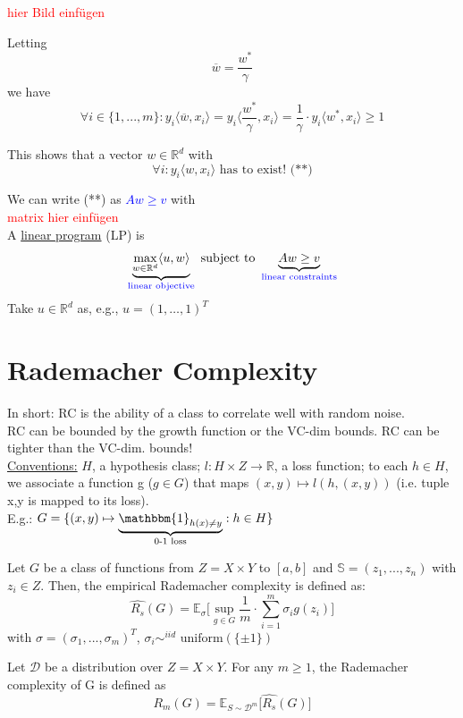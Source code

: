 \documentclass[10pt,a4paper]{article}
\theoremstyle{definition}
\theoremstyle{plain}
\begin{document}
\textcolor{red}{hier Bild einfügen}

Letting $$\overline{w} =  \frac{w^*}{\gamma}$$ we have 
$$
	\forall i \in \{ 1, ..., m \}: y_i \langle \overline{w}, x_i\rangle = y_i \langle \frac{w^*}{\gamma}, x_i \rangle = \frac{1}{\gamma} \cdot y_i \langle w^*, x_i \rangle \geq 1
$$

This shows that a vector $w \in \mathbb{R}^{d}$ with
$$
	\forall i: y_i \langle w, x_i \rangle \text{ has to exist! (**)}
$$

We can write (**) as \textcolor{blue}{$Aw \geq v$} with \\
\textcolor{red}{ matrix hier einfügen}\\
A \underline{linear program} (LP) is
$$
	\underbrace{\max_{w \in \mathbb{R}^{d}} \langle u, w \rangle}_{\text{\textcolor{blue}{linear objective}}} \text{ subject to } 
	\underbrace{Aw \geq v}_{\textcolor{blue}{\text{linear constraints}}}
$$ 
Take $u \in \mathbb{R}^{d}$ as, e.g., $u = (1, \hdots, 1)^T$ 

\part{Rademacher Complexity}
In short: RC is the ability of a class to correlate well with random noise.\\
RC can be bounded by the growth function or the VC-dim bounds. RC can be tighter than the VC-dim. bounds!\\
\underline{Conventions:} $H$, a hypothesis class; $l: H\times Z \to \mathbb{R}$, a loss function; to each $h \in H$, we associate a function g ($ g \in G$) that maps $(x,y) \mapsto l(h, (x,y)) $ (i.e. tuple x,y is mapped to its loss).\\
\newline
E.g.: $G = \{ (x,y) \mapsto \underbrace{\mathbbm{1}_{h(x) \neq y}}_{\text{0-1 loss}}: h\in H \}$

\begin{boxeddef}
	Let $G$ be a class of functions from $Z = X \times Y$ to $[a, b]$ and $\mathbb{S} = (z_1, ..., z_n)$ with $z_i \in Z$. Then, the empirical Rademacher complexity is defined as:
	$$
		\hat{R_s}(G) = \mathbb{E}_\sigma\bigg[\sup_{g \in G} \frac{1}{m} \cdot \sum_{i = 1}^{m} \sigma_i g(z_i)\bigg]
	$$
	with $\sigma = (\sigma_1, ..., \sigma_m)^T$, $\sigma_i \sim^{iid} \text{ uniform}\left(\{ \pm 1 \}\right)$
\end{boxeddef}

\begin{boxeddef}
	Let $\mathcal{D}$ be a distribution over $Z = X \times Y$. For any $m \geq 1$, the Rademacher complexity of G is defined as
	$$
		R_m(G) = \mathbb{E}_{S \sim \mathcal{D}^m} \big[\hat{R_s}(G)\big]
	$$
\end{boxeddef}
\end{document}
